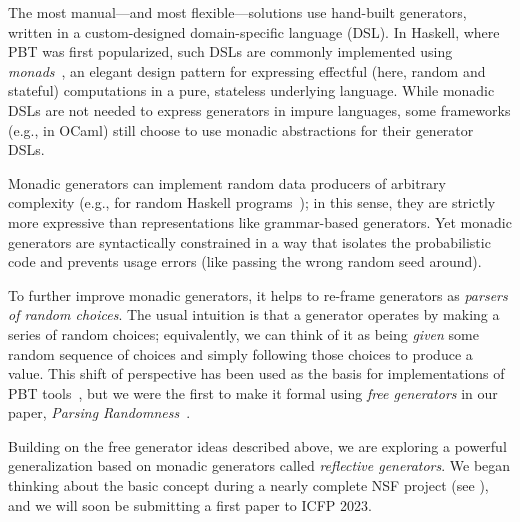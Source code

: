 The most manual---and most flexible---solutions use hand-built
generators, written in a custom-designed domain-specific language (DSL).
In Haskell, where PBT was
first popularized, such DSLs are commonly implemented using {\em
monads\/}~\cite{moggi1991notions}, an elegant design pattern for
expressing effectful (here, random and stateful) computations
in a pure, stateless underlying
language. While monadic DSLs are not
needed to express generators in
impure languages, some frameworks (e.g., in OCaml) still choose to use monadic
abstractions for their generator DSLs.

\smallskip
Monadic generators can implement random data producers of arbitrary complexity
(e.g., for random Haskell
programs~\cite{palka_testing_2011}); in this sense, they are strictly more expressive than
representations like grammar-based generators.  Yet monadic generators are
syntactically constrained in a way that isolates the probabilistic code and
prevents usage errors (like passing the wrong random seed around).

To further improve monadic generators, it helps to re-frame generators as {\em
  parsers of random choices}. The usual intuition is that a generator
operates by making a series of random choices; equivalently, we can think of
it as being {\em given} some random sequence of choices and simply following
those choices to produce a value. This shift of perspective has been
used as the basis for implementations of PBT
tools~\cite{maciver2019hypothesis, dolan2017testing}, but we were the
first to make it
formal using {\em free generators}
in our paper, {\em Parsing Randomness}~\cite{goldstein2022parsing}.


Building on the free generator ideas described above, we are
exploring a powerful
generalization based on monadic generators called {\em reflective generators}.
We began thinking about the basic concept during a nearly complete NSF
project (see ), and we will
soon be submitting a first paper to ICFP
2023.

